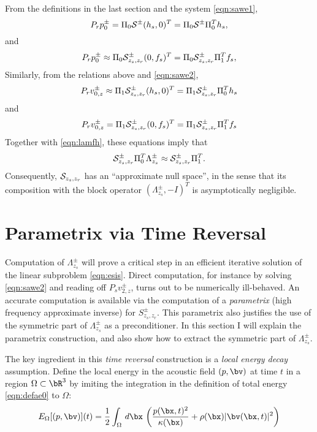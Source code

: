 From the definitions in the last section and the system \ref{eqn:sawe1},
\begin{equation}
  \label{eqn:pident0}
P_r p^{\pm}_0 = \Pi_0{\cal S}^{\pm}(h_s,0)^T = \Pi_0{\cal
  S}^{\pm}\Pi_0^Th_s,
\end{equation}
and
\begin{equation}
  \label{eqn:pident1}
P_r p^{\pm}_0 \approx \Pi_0{\cal S}^{\pm}_{z_s,z_r} (0,f_s)^T = \Pi_0{\cal
  S}^{\pm}_{z_s,z_r} \Pi_1^Tf_s,
\end{equation}
Similarly, from the relations above and \ref{eqn:sawe2},
\begin{equation}
  \label{eqn:vident0}
  P_r  v^{\pm}_{0,z}  \approx \Pi_1{\cal S}^{\pm}_{z_s,z_r}(h_s,0)^T  =
  \Pi_1{\cal S}^{\pm}_{z_s,z_r} \Pi_0^Th_s 
\end{equation}
and
\begin{equation}
  \label{eqn:vident1}
  P_r  v^{\pm}_{0,z}  = \Pi_1{\cal S}^{\pm}_{z_s,z_r}(0,f_s)^T  =
  \Pi_1{\cal S}^{\pm}_{z_s,z_r} \Pi_1^Tf_s 
\end{equation}
Together with \ref{eqn:lamfh}, these equations imply that
\begin{equation}
  \label{eqn:lamnull}
{\cal  S}_{z_s,z_r}^{\pm}\Pi_0^T\Lambda^{\pm}_{z_s} \approx {\cal S}^{\pm}_{z_s,z_r}\Pi_1^T.
\end{equation}
Consequently, ${\cal S}_{z_s,z_r}$ has an ``approximate null space'',
in the sense that its composition with the block operator
$(\Lambda^{\pm}_{z_s},-I)^T$ is asymptotically negligible.

\section{Parametrix via Time Reversal}

Computation of $\Lambda^{\pm}_{z_s}$ will prove a critical step in an
efficient iterative solution of the linear subproblem
\ref{eqn:esis}. Direct computation, for instance by solving
\ref{eqn:sawe2} and reading off $P_sv^{\pm}_{2,z}$, turns out to be
numerically ill-behaved. An accurate computation is available via the
computation of a {\em parametrix} (high frequency approximate inverse)
for $S^{\pm}_{z_s,z_r}$. This parametrix also justifies the use of the
symmetric part of $\Lambda^{\pm}_{z_s}$ as a preconditioner. In this
section I will explain the parametrix construction, and also show how
to extract the symmetric part of $\Lambda^{\pm}_{z_s}$.

The key ingredient in this {\em time reversal} construction is a
{\em local energy decay} assumption. Define the local energy in the
acoustic field $(p,\bv)$ at
time $t$ in a region $\Omega \subset \bR^3$ by imiting the integration
in the definition of total energy \ref{eqn:defae0} to $\Omega$:
\begin{equation}
  \label{eqn:defaeloc}
  E_{\Omega}[(p,\bv)](t) = \frac{1}{2} \int_{\Omega} \,d\bx \, \left(\frac{p(\bx,t)^2}{\kappa(\bx)} + \rho(\bx) |\bv(\bx,t)|^2\right)
\end{equation}

